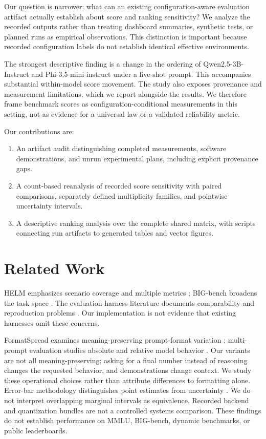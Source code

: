 Our question is narrower: what can an existing configuration-aware evaluation artifact actually establish about score and ranking sensitivity? We analyze the recorded outputs rather than treating dashboard summaries, synthetic tests, or planned runs as empirical observations. This distinction is important because recorded configuration labels do not establish identical effective environments.

The strongest descriptive finding is a change in the ordering of Qwen2.5-3B-Instruct and Phi-3.5-mini-instruct under a five-shot prompt. This accompanies substantial within-model score movement. The study also exposes provenance and measurement limitations, which we report alongside the results. We therefore frame benchmark scores as configuration-conditional measurements in this setting, not as evidence for a universal law or a validated reliability metric.

Our contributions are:
\begin{enumerate}
\item An artifact audit distinguishing completed measurements, software demonstrations, and unrun experimental plans, including explicit provenance gaps.
\item A count-based reanalysis of recorded score sensitivity with paired comparisons, separately defined multiplicity families, and pointwise uncertainty intervals.
\item A descriptive ranking analysis over the complete shared matrix, with scripts connecting run artifacts to generated tables and vector figures.
\end{enumerate}

\section{Related Work}
HELM emphasizes scenario coverage and multiple metrics \citep{liang2022holistic}; BIG-bench broadens the task space \citep{srivastava2022beyond}. The evaluation-harness literature documents comparability and reproduction problems \citep{biderman2024lessons}. Our implementation is not evidence that existing harnesses omit these concerns.

FormatSpread examines meaning-preserving prompt-format variation \citep{sclar2024quantifying}; multi-prompt evaluation studies absolute and relative model behavior \citep{mizrahi2024state}. Our variants are not all meaning-preserving: asking for a final number instead of reasoning changes the requested behavior, and demonstrations change context. We study these operational choices rather than attribute differences to formatting alone. Error-bar methodology distinguishes point estimates from uncertainty \citep{miller2024adding}. We do not interpret overlapping marginal intervals as equivalence. Recorded backend and quantization bundles are not a controlled systems comparison. These findings do not establish performance on MMLU, BIG-bench, dynamic benchmarks, or public leaderboards.

